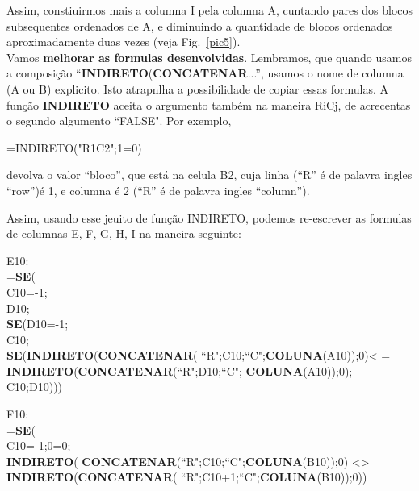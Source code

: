 \documentclass[12pt]{article}
\begin{document}
Assim, constiuirmos mais a columna I pela columna A, cuntando
pares dos blocos subsequentes ordenados de A, e diminuindo a
quantidade de blocos ordenados aproximadamente duas vezes (veja
Fig.~\ref{pic5}).\\

Vamos \textbf{melhorar as formulas desenvolvidas}. Lembramos, que
quando usamos a composi\c{c}\~ao
``\textbf{INDIRETO}(\textbf{CONCATENAR}...'', usamos o nome de
columna (A ou B) explicito. Isto atrapnlha a possibilidade de
copiar essas formulas. A fun\c{c}\~ao \textbf{INDIRETO} aceita o
argumento tamb\'em na maneira RiCj, de acrecentas o segundo
algumento ``FALSE". Por exemplo,

\centerline{=INDIRETO("R1C2";1=0)}

\noindent devolva o valor ``bloco'', que est\'a na celula B2, cuja
linha (``R'' \'e de palavra ingles ``row'')\'e 1, e columna \'e 2
(``R'' \'e de palavra ingles ``column'').

Assim, usando esse jeuito de fun\c{c}\~ao INDIRETO, podemos
re-escrever as formulas de columnas E, F, G, H, I na maneira
seguinte:

E10:\\
=\textbf{SE}(\\
C10=-1;\\
D10;\\
\textbf{SE}(D10=-1;\\
C10;\\
\textbf{SE}(\textbf{INDIRETO}(\textbf{CONCATENAR}(
``R";C10;``C";\textbf{COLUNA}(A10));0)\textless
=\\
\textbf{INDIRETO}(\textbf{CONCATENAR}(``R";D10;``C";
\textbf{COLUNA}(A10));0);\\
C10;D10)))

F10:\\
=\textbf{SE}(\\
C10=-1;0=0;\\
\textbf{INDIRETO}(
\textbf{CONCATENAR}(``R";C10;``C";\textbf{COLUNA}(B10));0)
\textless\textgreater\\
 \textbf{INDIRETO}(\textbf{CONCATENAR}(
``R";C10+1;``C";\textbf{COLUNA}(B10));0))
\end{document}

